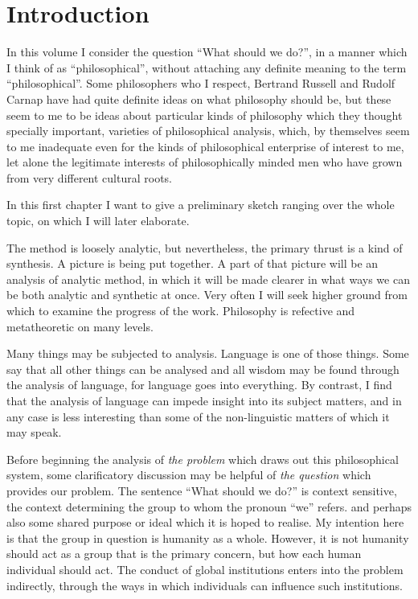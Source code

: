 \chapter{Introduction}

In this volume I consider the question ``What should we do?'', in a manner which I think of as ``philosophical'', without attaching any definite meaning to the term ``philosophical''.
Some philosophers who I respect, Bertrand Russell and Rudolf Carnap have had quite definite ideas on what philosophy should be, but these seem to me to be ideas about particular kinds of philosophy which they thought specially important, varieties of philosophical analysis, which, by themselves seem to me inadequate even for the kinds of philosophical enterprise of interest to me, let alone the legitimate interests of philosophically minded men who have grown from very different cultural roots.

In this first chapter I want to give a preliminary sketch ranging over the whole topic, on which I will later elaborate.

The method is loosely analytic, but nevertheless, the primary thrust is a kind of synthesis.
A picture is being put together.
A part of that picture will be an analysis of analytic method, in which it will be made clearer in what ways we can be both analytic and synthetic at once.
Very often I will seek higher ground from which to examine the progress of the work.
Philosophy is refective and metatheoretic on many levels.

Many things may be subjected to analysis.
Language is one of those things.
Some say that all other things can be analysed and all wisdom may be found through the analysis of language, for language goes into everything.
By contrast, I find that the analysis of language can impede insight into its subject matters, and in any case is less interesting than some of the non-linguistic matters of which it may speak. 

Before beginning the analysis of \emph{the problem} which draws out this philosophical system, some clarificatory discussion may be helpful of \emph{the question} which provides our problem.
The sentence ``What should we do?'' is context sensitive, the context determining the group to whom the pronoun ``we'' refers. and perhaps also some shared purpose or ideal which it is hoped to realise.
My intention here is that the group in question is humanity as a whole.
However, it is not humanity should act as a group that is the primary concern, but how each human individual should act.
The conduct of global institutions enters into the problem indirectly, through the ways in which individuals can influence such institutions.

